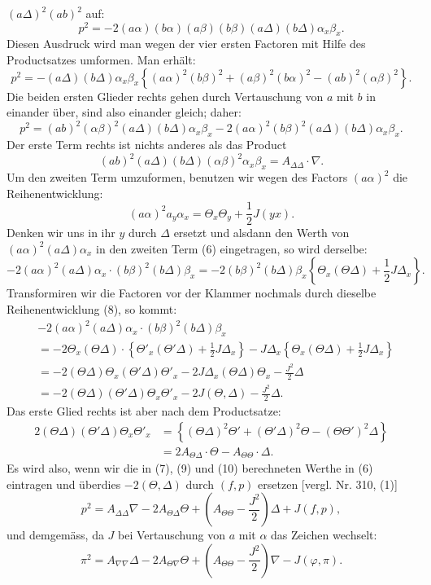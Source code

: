 \documentclass[11pt]{article}
\providecommand{\weberpage}[1]{}
\providecommand{\weq}[2]{\begin{equation}\tag{#1}#2\end{equation}}
\let\Delta\varDelta
\let\Theta\varTheta
\begin{document}
\weberpage{337}
$(a\Delta)^2(ab)^2$ auf:
\[
p^2 = -2(a\alpha)(b\alpha)(a\beta)(b\beta)(a\Delta)(b\Delta)\alpha_x\beta_x.
\]
Diesen Ausdruck wird man wegen der vier ersten Factoren mit Hilfe des Productsatzes umformen. Man erhält:
\[
p^2 = -(a\Delta)(b\Delta)\alpha_x\beta_x\left\{(a\alpha)^2(b\beta)^2+(a\beta)^2(b\alpha)^2-(ab)^2(\alpha\beta)^2\right\}.
\]
Die beiden ersten Glieder rechts gehen durch Vertauschung von $a$ mit $b$ in einander über, sind also einander gleich; daher:
\weq{6}{p^2 = (ab)^2(\alpha\beta)^2(a\Delta)(b\Delta)\alpha_x\beta_x - 2(a\alpha)^2(b\beta)^2(a\Delta)(b\Delta)\alpha_x\beta_x.}
Der erste Term rechts ist nichts anderes als das Product
\weq{7}{(ab)^2(a\Delta)(b\Delta)(\alpha\beta)^2\alpha_x\beta_x = A_{\Delta\Delta}\cdot \nabla.}
Um den zweiten Term umzuformen, benutzen wir wegen des Factors $(a\alpha)^2$ die Reihenentwicklung:
\weq{8}{(a\alpha)^2 a_y \alpha_x = \Theta_x\Theta_y + \frac{1}{2}J(yx).}
Denken wir uns in ihr $y$ durch $\Delta$ ersetzt und alsdann den Werth von $(a\alpha)^2(a\Delta)\alpha_x$ in den zweiten Term (6) eingetragen, so wird derselbe:
\[
-2(a\alpha)^2(a\Delta)\alpha_x\cdot(b\beta)^2(b\Delta)\beta_x = -2(b\beta)^2(b\Delta)\beta_x\left\{\Theta_x(\Theta\Delta)+\frac{1}{2}J\Delta_x\right\}.
\]
Transformiren wir die Factoren vor der Klammer nochmals durch dieselbe Reihenentwicklung (8), so kommt:
\weq{9}{\begin{aligned}
&-2(a\alpha)^2(a\Delta)\alpha_x\cdot(b\beta)^2(b\Delta)\beta_x\\
&= -2\Theta_x(\Theta\Delta)\cdot\left\{\Theta'_x(\Theta'\Delta)+\frac{1}{2}J\Delta_x\right\} - J\Delta_x\left\{\Theta_x(\Theta\Delta)+\frac{1}{2}J\Delta_x\right\}\\
&= -2(\Theta\Delta)\Theta_x(\Theta'\Delta)\Theta'_x - 2J\Delta_x(\Theta\Delta)\Theta_x - \frac{J^2}{2}\Delta\\
&= -2(\Theta\Delta)(\Theta'\Delta)\Theta_x\Theta'_x - 2J(\Theta,\Delta) - \frac{J^2}{2}\Delta.
\end{aligned}}
Das erste Glied rechts ist aber nach dem Productsatze:
\weq{10}{\begin{aligned}
2(\Theta\Delta)(\Theta'\Delta)\Theta_x\Theta'_x &= \left\{(\Theta\Delta)^2\Theta' + (\Theta'\Delta)^2\Theta - (\Theta\Theta')^2\Delta\right\}\\
&= 2A_{\Theta\Delta}\cdot\Theta - A_{\Theta\Theta}\cdot\Delta.
\end{aligned}}
Es wird also, wenn wir die in (7), (9) und (10) berechneten Werthe in (6) eintragen und überdies $-2(\Theta,\Delta)$ durch $(f,p)$ ersetzen [vergl. Nr. 310, (1)]
\weq{11}{p^2 = A_{\Delta\Delta}\nabla - 2A_{\Theta\Delta}\Theta + \left(A_{\Theta\Theta}-\frac{J^2}{2}\right)\Delta + J(f,p),}
und demgemäss, da $J$ bei Vertauschung von $a$ mit $\alpha$ das Zeichen wechselt:
\weq{12}{\pi^2 = A_{\nabla\nabla}\Delta - 2A_{\Theta\nabla}\Theta + \left(A_{\Theta\Theta}-\frac{J^2}{2}\right)\nabla - J(\varphi,\pi).}
\end{document}
